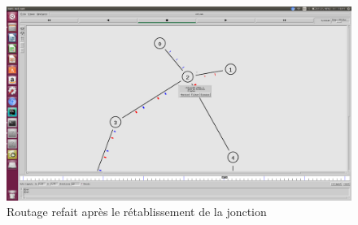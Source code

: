 \documentclass{article}
\begin{document}
    \begin{figure}
    \centering
    \includegraphics[width=0.99\columnwidth]{tp2-1-DV-5-relink_triggered.png}
    \caption{Routage refait après le rétablissement de la jonction}
    \end{figure}
    
\end{document}

